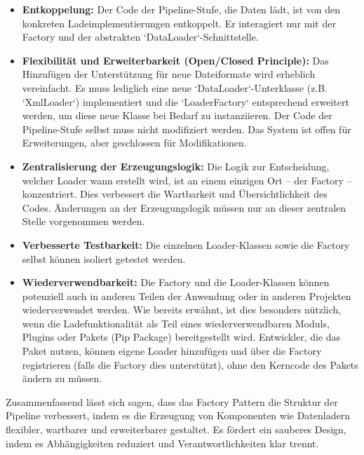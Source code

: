 \documentclass[a4paper]{article} %
\begin{document}
\begin{itemize}
    \item \textbf{Entkoppelung:} Der Code der Pipeline-Stufe, die Daten lädt, ist von den konkreten Ladeimplementierungen entkoppelt. Er interagiert nur mit der Factory und der abstrakten `DataLoader`-Schnittstelle.
    \item \textbf{Flexibilität und Erweiterbarkeit (Open/Closed Principle):} Das Hinzufügen der Unterstützung für neue Dateiformate wird erheblich vereinfacht. Es muss lediglich eine neue `DataLoader`-Unterklasse (z.B. `XmlLoader`) implementiert und die `LoaderFactory` entsprechend erweitert werden, um diese neue Klasse bei Bedarf zu instanziieren. Der Code der Pipeline-Stufe selbst muss nicht modifiziert werden. Das System ist offen für Erweiterungen, aber geschlossen für Modifikationen.
    \item \textbf{Zentralisierung der Erzeugungslogik:} Die Logik zur Entscheidung, welcher Loader wann erstellt wird, ist an einem einzigen Ort – der Factory – konzentriert. Dies verbessert die Wartbarkeit und Übersichtlichkeit des Codes. Änderungen an der Erzeugungslogik müssen nur an dieser zentralen Stelle vorgenommen werden.
    \item \textbf{Verbesserte Testbarkeit:} Die einzelnen Loader-Klassen sowie die Factory selbst können isoliert getestet werden.
    \item \textbf{Wiederverwendbarkeit:} Die Factory und die Loader-Klassen können potenziell auch in anderen Teilen der Anwendung oder in anderen Projekten wiederverwendet werden. Wie bereits erwähnt, ist dies besonders nützlich, wenn die Ladefunktionalität als Teil eines wiederverwendbaren Moduls, Plugins oder Pakets (Pip Package) bereitgestellt wird. Entwickler, die das Paket nutzen, können eigene Loader hinzufügen und über die Factory registrieren (falls die Factory dies unterstützt), ohne den Kerncode des Pakets ändern zu müssen.
\end{itemize}

Zusammenfassend lässt sich sagen, dass das Factory Pattern die Struktur der Pipeline verbessert, indem es die Erzeugung von Komponenten wie Datenladern flexibler, wartbarer und erweiterbarer gestaltet. Es fördert ein sauberes Design, indem es Abhängigkeiten reduziert und Verantwortlichkeiten klar trennt.
\end{document}
